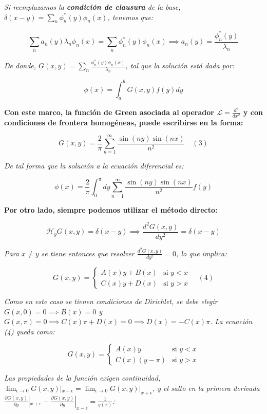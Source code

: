 \documentclass[a4paper]{article}
\begin{document}
\textit{Si reemplazamos la \textbf{condición de clausura} de la base, $\delta(x - y) = \sum_n \phi_n^*(y)\phi_n(x)$, tenemos que:}

$$ \sum_n a_n(y) \lambda_n \phi_n(x) = \sum_n \phi_n^*(y) \phi_n(x) \implies a_n(y) = \frac{\phi_n^*(y)}{\lambda_n} $$

\textit{De donde, $G(x, y) = \sum_n \frac{\phi_n^*(y)\phi_n(x)}{\lambda_n}$, tal que la solución está dada por:}

$$ \phi(x) = \int_a^b G(x, y) f(y) dy $$

\textbf{Con este marco, la función de Green asociada al operador $\mathscr{L} = \frac{d^2}{dx^2}$ y con condiciones de frontera homogéneas, puede escribirse en la forma:}

$$ G(x, y) = \frac{2}{\pi} \sum_{n=1}^\infty \frac{\sin(ny) \sin(nx)}{n^2} \quad (3) $$

\textit{De tal forma que la solución a la ecuación diferencial es:}

$$ \phi(x) = \frac{2}{\pi} \int_0^\pi dy \sum_{n=1}^\infty \frac{\sin(ny) \sin(nx)}{n^2} f(y) $$

\textbf{Por otro lado, siempre podemos utilizar el método directo:}

$$ \mathscr{H}_y G(x, y) = \delta(x - y) \implies \frac{d^2G(x, y)}{dy^2} = \delta(x - y) $$

\textit{Para $x \neq y$ se tiene entonces que resolver $\frac{d^2G(x, y)}{dy^2} = 0$, lo que implica:}

$$ G(x, y) = \begin{cases} A(x)y + B(x) & \text{si } y < x \\ C(x)y + D(x) & \text{si } y > x \end{cases} \quad (4) $$

\textit{Como en este caso se tienen condiciones de Dirichlet, se debe elegir $G(x, 0) = 0 \implies B(x) = 0$ y $G(x, \pi) = 0 \implies C(x)\pi + D(x) = 0 \implies D(x) = -C(x)\pi$. La ecuación (4) queda como:}

$$ G(x, y) = \begin{cases} A(x)y & \text{si } y < x \\ C(x)(y - \pi) & \text{si } y > x \end{cases} $$

\textit{Las propiedades de la función exigen continuidad, $\lim_{\epsilon \to 0} G(x, y)|_{x-\epsilon} = \lim_{\epsilon \to 0} G(x, y)|_{x+\epsilon}$, y el salto en la primera derivada $\frac{\partial G(x, y)}{\partial y}|_{x+\epsilon} - \frac{\partial G(x, y)}{\partial y}|_{x-\epsilon} = \frac{1}{q(x)}$:}
\end{document}
